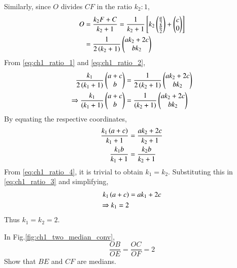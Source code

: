 %
Similarly, since $O$ divides $CF$ in the ratio $k_2:1$,
\begin{align}
O &= \frac{k_2F+C}{k_2+1} = \frac{1}{k_2+1}{}\left[
k_2
\begin{pmatrix}
\frac{a}{2}
\\
\frac{b}{2}
\end{pmatrix}
+
\begin{pmatrix}
c
\\
0
\end{pmatrix}
\right]
\\
&= \frac{1}{2\left(k_2+1\right)}
\begin{pmatrix}
ak_2+2c
\\
bk_2
\end{pmatrix}
\label{eq:ch1_ratio_2}
\end{align}
From \eqref{eq:ch1_ratio_1} and \eqref{eq:ch1_ratio_2},
\begin{align}
\frac{k_1}{2\left(k_1+1\right)}
\begin{pmatrix}
a+c
\\
b
\end{pmatrix}
&=
\frac{1}{2\left(k_2+1\right)}
\begin{pmatrix}
ak_2+2c
\\
bk_2
\end{pmatrix}
\\
\Rightarrow
\frac{k_1}{\left(k_1+1\right)}
\begin{pmatrix}
a+c
\\
b
\end{pmatrix}
&=
\frac{1}{\left(k_2+1\right)}
\begin{pmatrix}
ak_2+2c
\\
bk_2
\end{pmatrix}
\end{align}
By equating the respective coordinates,
%
\begin{align}
\label{eq:ch1_ratio_3}
\frac{k_1\left(a+c\right)}{k_1+1} &= \frac{ak_2+2c}{k_2+1}
\\
\frac{k_1b}{k_1+1} &= \frac{k_2b}{k_2+1}
\label{eq:ch1_ratio_4}
\end{align}
%
From \eqref{eq:ch1_ratio_4}, it is trivial to obtain $k_1=k_2$.  Substituting this in \eqref{eq:ch1_ratio_3} and simplifying,
\begin{align}
k_1\left(a+c\right) &= ak_1 + 2c
\\
\Rightarrow k_1 = 2
\end{align}
Thus $k_1=k_2=2$.
\begin{problem}
In Fig.\ref{fig:ch1_two_median_conv},
\begin{equation}
\frac{OB}{OE} = \frac{OC}{OF} = 2
\end{equation}
Show that $BE$ and $CF$ are medians.
\end{problem}
